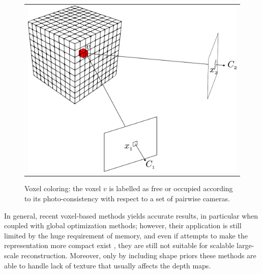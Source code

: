 \begin{figure}[t]
 \begin{tabular}{c}
  \includegraphics[width=0.98\columnwidth]{./img/ch_soa/volumetric}\\
 \end{tabular}
 \caption{Voxel coloring: the voxel $v$ is labelled as free or occupied according to its photo-consistency with respect to a set of pairwise cameras.}
 \label{fig:volumetric}
\end{figure}


In general, recent voxel-based methods yields accurate results, in particular when coupled with global optimization methods; however, their application is still limited by the huge requirement of memory, and even if attempts to make the representation more compact exist \cite{steinbrucker2014volumetric,chen2013scalable,zeng2013octree}, they are still not suitable for scalable large-scale reconstruction.
Moreover, only by including shape priors these methods are able to handle lack of texture \cite{karimi2015segment} that usually affects the depth maps.



